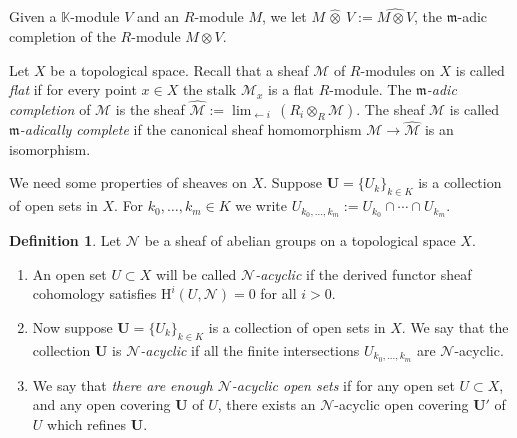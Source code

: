 \documentclass[a4paper, 10pt]{amsart}
\theoremstyle{definition}
\newtheorem{dfn}[equation]{Definition}
\numberwithin{equation}{section}
\newcommand{\mfrak}[1]{\mathfrak{#1}}
\newcommand{\mcal}[1]{\mathcal{#1}}
\newcommand{\mrm}[1]{\mathrm{#1}}
\newcommand{\mbb}[1]{\mathbb{#1}}
\newcommand{\bsym}[1]{\boldsymbol{#1}}
\newcommand{\ot}{\otimes}
\newcommand{\hatotimes}[1]{\, \what{{\otimes}}_{#1} \,}
\newcommand{\hot}{\hatotimes{}}
\newcommand{\what}[1]{\widehat{#1}}
\newcommand{\K}{\mbb{K}}
\newcommand{\m}{\mfrak{m}}
\begin{document}
Given a $\K$-module $V$ and an $R$-module $M$, we let
$M \hot V := \what{M \ot V}$, the $\m$-adic completion of the $R$-module 
$M \ot V$.  

Let $X$ be a topological space. Recall that a sheaf $\mcal{M}$ 
of $R$-modules on $X$ is called {\em flat} if for every point 
$x \in X$ the stalk $\mcal{M}_x$ is a flat $R$-module. 
The {\em $\m$-adic completion} of $\mcal{M}$ is the sheaf 
$\what{\mcal{M}} := \lim_{\leftarrow i}\, (R_i \otimes_R \mcal{M})$.
The sheaf $\mcal{M}$ is called {\em $\m$-adically complete} if the
canonical sheaf homomorphism 
$\mcal{M} \to \what{\mcal{M}}$ is an isomorphism.

We need some properties of sheaves on $X$.
Suppose $\bsym{U} = \{ U_k \}_{k \in K}$ is a collection of
open sets in $X$. For $k_0, \ldots, k_m \in K$ we write
$U_{k_0, \ldots, k_m} := U_{k_0} \cap \cdots \cap U_{k_m}$.

\begin{dfn} \label{dfn:23}
Let $\mcal{N}$ be a sheaf of abelian groups on a topological space
$X$. 
\begin{enumerate}
\item An open set $U \subset X$ will be called {\em
$\mcal{N}$-acyclic} if the derived functor sheaf cohomology satisfies
$\mrm{H}^i (U, \mcal{N}) = 0$ for all $i > 0$.
%
\item Now suppose $\bsym{U} = \{ U_k \}_{k \in K}$ is a collection of
open sets in $X$. We say that the collection $\bsym{U}$ is
{\em $\mcal{N}$-acyclic} if all the finite intersections
$U_{k_0, \ldots, k_m}$ are $\mcal{N}$-acyclic.
%
\item We say that {\em there are enough $\mcal{N}$-acyclic open
sets} if for any open set $U \subset X$, and any open covering
$\bsym{U}$ of $U$, there exists an $\mcal{N}$-acyclic open covering
$\bsym{U}'$ of $U$ which refines $\bsym{U}$.
\end{enumerate}
\end{dfn}
\end{document}
